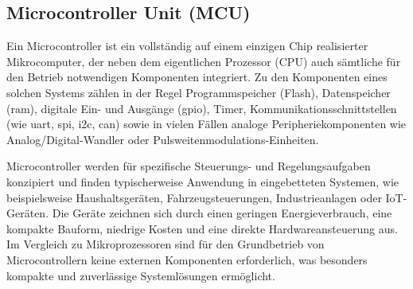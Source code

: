\subsection{Microcontroller Unit (MCU)}
Ein Microcontroller ist ein vollständig auf einem einzigen Chip realisierter Mikrocomputer, der neben dem eigentlichen Prozessor (CPU) auch sämtliche für den Betrieb notwendigen Komponenten integriert. 
Zu den Komponenten eines solchen Systems zählen in der Regel Programmspeicher (Flash), Datenspeicher (\gls{ram}), digitale Ein- und Ausgänge (\gls{gpio}), Timer, Kommunikationsschnittstellen (wie \gls{uart}, \gls{spi}, \gls{i2c}, \gls{can}) sowie in vielen Fällen analoge Peripheriekomponenten wie Analog/Digital-Wandler oder Pulsweitenmodulations-Einheiten.

Microcontroller werden für spezifische Steuerungs- und Regelungsaufgaben konzipiert und finden typischerweise Anwendung in eingebetteten Systemen, wie beispielsweise Haushaltsgeräten, Fahrzeugsteuerungen, Industrieanlagen oder IoT-Geräten. 
Die Geräte zeichnen sich durch einen geringen Energieverbrauch, eine kompakte Bauform, niedrige Kosten und eine direkte Hardwareansteuerung aus. 
Im Vergleich zu Mikroprozessoren sind für den Grundbetrieb von Microcontrollern keine externen Komponenten erforderlich, was besonders kompakte und zuverlässige Systemlösungen ermöglicht.


